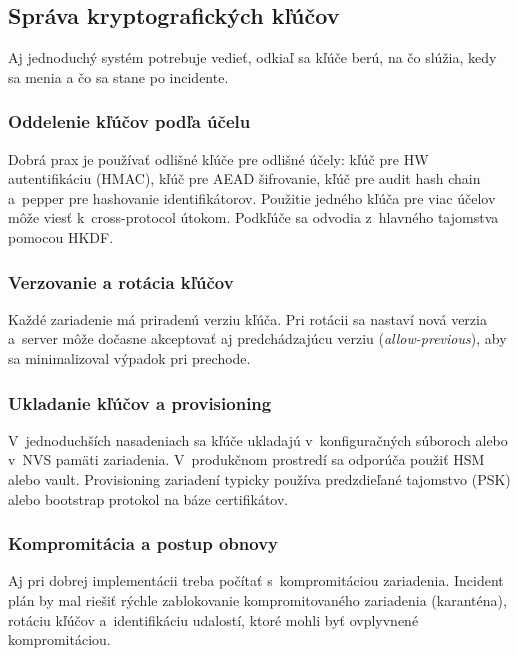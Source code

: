 
\subsection{Správa kryptografických kľúčov}

Aj jednoduchý systém potrebuje vedieť, odkiaľ sa kľúče berú, na čo slúžia, kedy sa menia a čo sa stane po incidente\cite{NIST80057}.

\subsubsection{Oddelenie kľúčov podľa účelu}

Dobrá prax je používať odlišné kľúče pre odlišné účely: kľúč pre HW autentifikáciu (HMAC), kľúč pre AEAD šifrovanie, kľúč pre audit hash chain a~pepper pre hashovanie identifikátorov. Použitie jedného kľúča pre viac účelov môže viesť k~cross-protocol útokom. Podkľúče sa odvodia z~hlavného tajomstva pomocou HKDF\cite{RFC5869}.

\subsubsection{Verzovanie a rotácia kľúčov}

Každé zariadenie má priradenú verziu kľúča. Pri rotácii sa nastaví nová verzia a~server môže dočasne akceptovať aj predchádzajúcu verziu (\emph{allow-previous}), aby sa minimalizoval výpadok pri prechode\cite{NIST80057}.

\subsubsection{Ukladanie kľúčov a provisioning}

V~jednoduchších nasadeniach sa kľúče ukladajú v~konfiguračných súboroch alebo v~NVS pamäti zariadenia. V~produkčnom prostredí sa odporúča použiť HSM alebo vault\cite{NIST80057}. Provisioning zariadení typicky používa predzdieľané tajomstvo (PSK) alebo bootstrap protokol na báze certifikátov.

\subsubsection{Kompromitácia a postup obnovy}

Aj pri dobrej implementácii treba počítať s~kompromitáciou zariadenia\cite{NIST80057}. Incident plán by mal riešiť rýchle zablokovanie kompromitovaného zariadenia (karanténa), rotáciu kľúčov a~identifikáciu udalostí, ktoré mohli byť ovplyvnené kompromitáciou.

